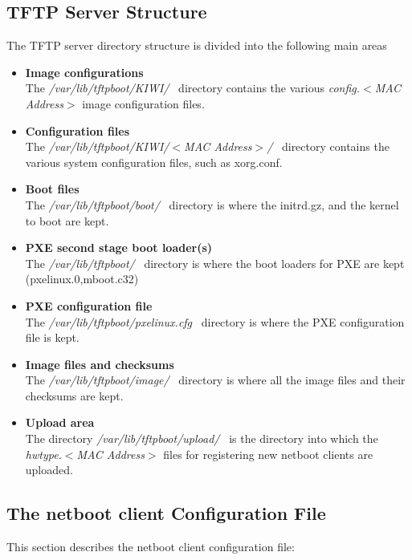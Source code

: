\subsection{TFTP Server Structure}
\label{section:tftpstruct}
The TFTP server directory structure is divided into the following main areas

\begin{itemize}
\item \textbf{Image configurations}\\
      The \textit{/var/lib/tftpboot/KIWI/}~ directory contains the various
      \textit{config.$<$MAC Address$>$} image configuration files.
\item \textbf{Configuration files}\\
      The \textit{/var/lib/tftpboot/KIWI/$<$MAC Address$>$/}~ directory
      contains the various system configuration files, such as xorg.conf.
\item \textbf{Boot files}\\
      The \textit{/var/lib/tftpboot/boot/}~ directory is where the initrd.gz,
      and the kernel to boot are kept.
\item \textbf{PXE second stage boot loader(s)}\\
      The \textit{/var/lib/tftpboot/}~ directory is where the boot loaders
      for PXE are kept (pxelinux.0,mboot.c32)
\item \textbf{PXE configuration file}\\
      The \textit{/var/lib/tftpboot/pxelinux.cfg}~ directory is where
      the PXE configuration file is kept.
\item \textbf{Image files and checksums}\\
      The \textit{/var/lib/tftpboot/image/}~ directory is where all the image
      files and their checksums are kept.
\item \textbf{Upload area}\\
      The directory \textit{/var/lib/tftpboot/upload/}~ is the directory into
      which the \textit{hwtype.$<$MAC Address$>$} files for registering
      new netboot clients are uploaded.
\end{itemize}


\subsection{The netboot client Configuration File}
\label{section:confmac}
This section describes the netboot client configuration file:

